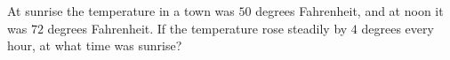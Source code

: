 At sunrise the temperature in a town was $50$ degrees Fahrenheit, and at noon it was $72$ degrees Fahrenheit. If the temperature rose steadily by $4$ degrees every hour, at what time was sunrise?

